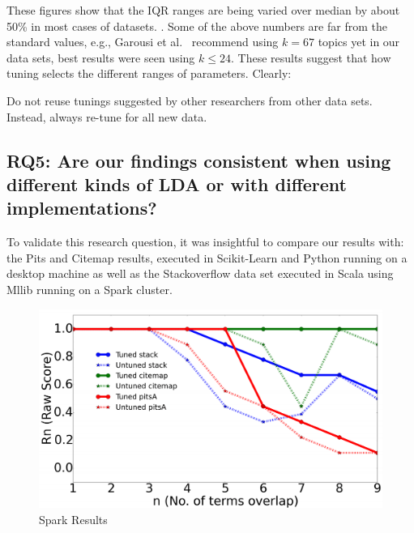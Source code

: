 \documentclass[twocolumn,5p,sort&compress]{elsarticle}
\theoremstyle{break}
\begin{document}
These figures
show that the IQR ranges are being varied over median by about 50\% in most cases of datasets. . 
Some of the above numbers are far from the standard values, e.g., Garousi et al.~\cite{garousi2016citations} recommend using $k=67$ topics
yet in our data sets, best results were seen using $k \le 24$. These results suggest that how tuning selects the different ranges of parameters.
Clearly:

\begin{lesson}
  Do not  reuse tunings suggested by other researchers from other data sets.
  Instead, always re-tune for all new data.
\end{lesson}

\subsection{\textbf{RQ5}: \textbf{Are our findings consistent when using different kinds of LDA or with different implementations?}}
\label{sect:vem-gibbs}

To validate this research question, it was insightful to compare our results with: the Pits and Citemap results, executed in Scikit-Learn and Python running on a desktop machine as well as the Stackoverflow data set executed in Scala using Mllib running on a Spark cluster.

\begin{figure}[!b]
  \captionsetup{justification=centering}
  \includegraphics[width=\linewidth]{./fig/spark.png}
  \caption{Spark Results}
  \label{python_spark}
\end{figure}
\end{document}
